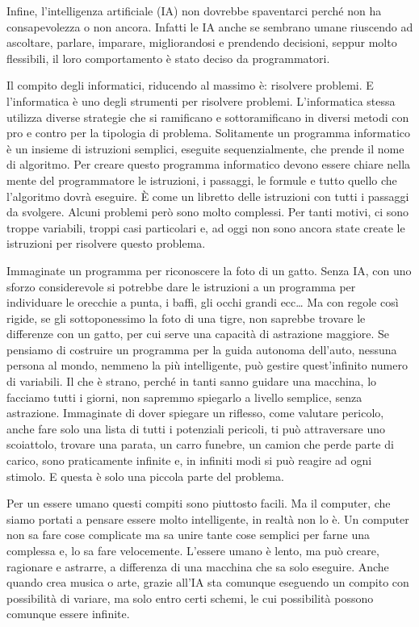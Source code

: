 \documentclass[12pt]{book} %
\begin{document}
Infine, l'intelligenza artificiale (IA) non dovrebbe spaventarci perché non ha consapevolezza o non
ancora. Infatti le IA anche se sembrano umane riuscendo ad ascoltare, parlare, imparare, migliorandosi e prendendo
decisioni, seppur molto flessibili, il loro comportamento è stato deciso da programmatori.

Il compito degli informatici, riducendo al massimo è: risolvere problemi. E l'informatica è uno
degli strumenti per risolvere problemi. L'informatica stessa utilizza diverse strategie che si
ramificano e sottoramificano in diversi metodi con pro e contro per la tipologia di problema. Solitamente un programma
informatico è un insieme di istruzioni semplici, eseguite sequenzialmente, che prende il nome di algoritmo. Per creare
questo programma informatico devono essere chiare nella mente del programmatore le istruzioni, i passaggi, le formule e
tutto quello che l'algoritmo dovrà eseguire. È come un libretto delle istruzioni con tutti i
passaggi da svolgere. Alcuni problemi però sono molto complessi. Per tanti motivi, ci sono troppe variabili, troppi
casi particolari e, ad oggi non sono ancora state create le istruzioni per risolvere questo problema. 

Immaginate un programma per riconoscere la foto di un gatto. Senza IA, con uno sforzo considerevole si potrebbe dare le
istruzioni a un programma per individuare le orecchie a punta, i baffi, gli occhi grandi ecc… Ma con regole così
rigide, se gli sottoponessimo la foto di una tigre, non saprebbe trovare le differenze con un gatto, per cui serve una
capacità di astrazione maggiore. Se pensiamo di costruire un programma per la guida autonoma
dell'auto, nessuna persona al mondo, nemmeno la più intelligente, può gestire
quest'infinito numero di variabili. Il che è strano, perché in tanti sanno guidare una macchina,
lo facciamo tutti i giorni, non sapremmo spiegarlo a livello semplice, senza astrazione. Immaginate di dover spiegare
un riflesso, come valutare pericolo, anche fare solo una lista di tutti i potenziali pericoli, ti può attraversare uno
scoiattolo, trovare una parata, un carro funebre, un camion che perde parte di carico, sono praticamente infinite e, in
infiniti modi si può reagire ad ogni stimolo. E questa è solo una piccola parte del problema. 

Per un essere umano questi compiti sono piuttosto facili. Ma il computer, che siamo portati a pensare essere molto
intelligente, in realtà non lo è. Un computer non sa fare cose complicate ma sa unire tante cose semplici per farne una
complessa e, lo sa fare velocemente. L'essere umano è lento, ma può creare, ragionare e astrarre,
a differenza di una macchina che sa solo eseguire. Anche quando crea musica o arte, grazie all'IA
sta comunque eseguendo un compito con possibilità di variare, ma solo entro certi schemi, le cui possibilità possono
comunque essere infinite.
\end{document}
